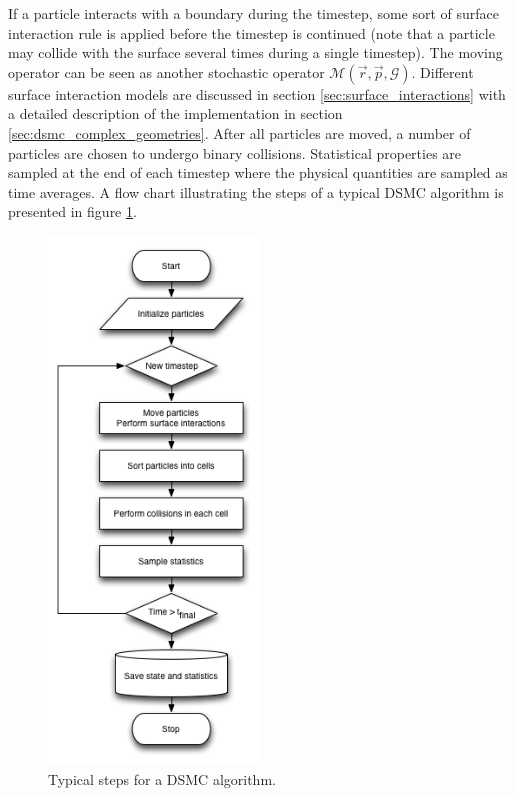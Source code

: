 If a particle interacts with a boundary during the timestep, some sort of surface interaction rule is applied before the timestep is continued (note that a particle may collide with the surface several times during a single timestep). The moving operator can be seen as another stochastic operator $\mathcal{M}(\vec r, \vec p, \mathcal{G})$. Different surface interaction models are discussed in section \ref{sec:surface_interactions} with a detailed description of the implementation in section \ref{sec:dsmc_complex_geometries}. After all particles are moved, a number of particles are chosen to undergo binary collisions. Statistical properties are sampled at the end of each timestep where the physical quantities are sampled as time averages. A flow chart illustrating the steps of a typical DSMC algorithm is presented in figure \ref{fig:dsmc_flowchart}.
\begin{figure}[h]
\begin{center}
\includegraphics[width=0.5\textwidth, trim=0cm 0cm 0cm 0cm, clip]{DSMC/figures/dsmc_flowchart.png}
\end{center}
\caption{Typical steps for a DSMC algorithm.}
\label{fig:dsmc_flowchart}
\end{figure}

